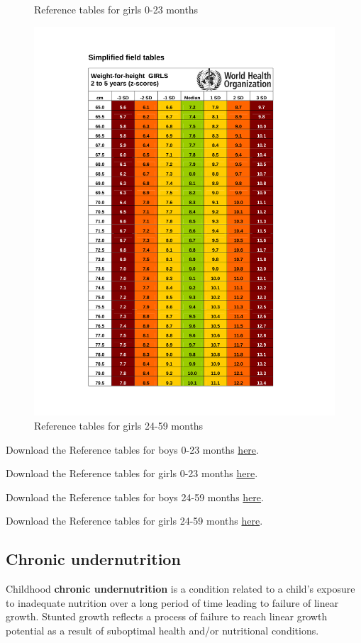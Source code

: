 \documentclass[12pt,]{book}
\theoremstyle{definition}
\theoremstyle{definition}
\theoremstyle{definition}
\theoremstyle{remark}
\let\BeginKnitrBlock\begin \let\EndKnitrBlock\end
\begin{document}
\begin{figure}
{}

\caption{Reference tables for girls 0-23 months}\label{fig:anthro13}
\end{figure}\begin{figure}

{\centering \includegraphics[width=0.5\linewidth]{pdf/girls_24_60} 

}

\caption{Reference tables for girls 24-59 months}\label{fig:anthro14}
\end{figure}

\BeginKnitrBlock{rmddownload}
Download the Reference tables for boys 0-23 months
\href{\%22pdf/boys_0_24.pdf\%22}{here}.

Download the Reference tables for girls 0-23 months
\href{\%22pdf/girls_0_24.pdf\%22}{here}.

Download the Reference tables for boys 24-59 months
\href{\%22pdf/boys_24_60.pdf\%22}{here}.

Download the Reference tables for girls 24-59 months
\href{\%22pdf/girls_24_60.pdf\%22}{here}.
\EndKnitrBlock{rmddownload}

\hypertarget{chronic-undernutrition}{%
\subsection{Chronic undernutrition}\label{chronic-undernutrition}}

Childhood \textbf{chronic undernutrition} is a condition related to a
child's exposure to inadequate nutrition over a long period of time
leading to failure of linear growth. Stunted growth reflects a process
of failure to reach linear growth potential as a result of suboptimal
health and/or nutritional conditions.
\end{document}
